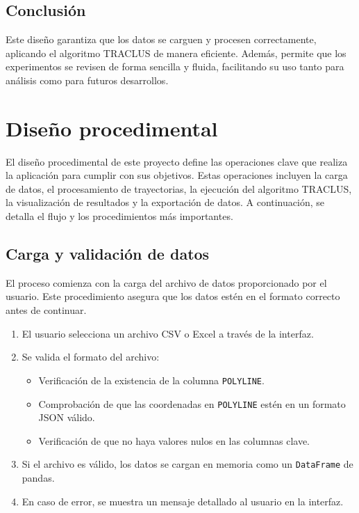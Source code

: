 \subsection{Conclusión}

Este diseño garantiza que los datos se carguen y procesen correctamente, aplicando el algoritmo TRACLUS de manera eficiente. Además, permite que los experimentos se revisen de forma sencilla y fluida, facilitando su uso tanto para análisis como para futuros desarrollos.

\section{Diseño procedimental}

El diseño procedimental de este proyecto define las operaciones clave que realiza la aplicación para cumplir con sus objetivos. Estas operaciones incluyen la carga de datos, el procesamiento de trayectorias, la ejecución del algoritmo TRACLUS, la visualización de resultados y la exportación de datos. A continuación, se detalla el flujo y los procedimientos más importantes.

\subsection{Carga y validación de datos}

El proceso comienza con la carga del archivo de datos proporcionado por el usuario. Este procedimiento asegura que los datos estén en el formato correcto antes de continuar.

\begin{enumerate}
    \item El usuario selecciona un archivo CSV o Excel a través de la interfaz.
    \item Se valida el formato del archivo:
    \begin{itemize}
        \item Verificación de la existencia de la columna \texttt{POLYLINE}.
        \item Comprobación de que las coordenadas en \texttt{POLYLINE} estén en un formato JSON válido.
        \item Verificación de que no haya valores nulos en las columnas clave.
    \end{itemize}
    \item Si el archivo es válido, los datos se cargan en memoria como un \texttt{DataFrame} de pandas.
    \item En caso de error, se muestra un mensaje detallado al usuario en la interfaz.
\end{enumerate}

